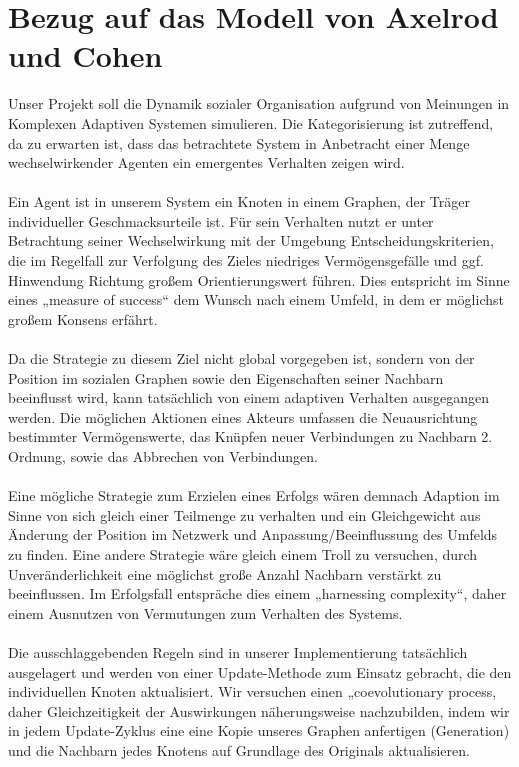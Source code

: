 \documentclass[11pt, a4paper]{scrartcl}
\begin{document}
\section{Bezug auf das Modell von Axelrod und Cohen}


Unser Projekt soll die Dynamik sozialer Organisation aufgrund von Meinungen in Komplexen Adaptiven Systemen simulieren. Die Kategorisierung ist zutreffend, da zu erwarten ist, dass das betrachtete System in Anbetracht einer Menge wechselwirkender Agenten ein emergentes Verhalten zeigen wird. \\
\\
Ein Agent ist in unserem System ein Knoten in einem Graphen, der Träger individueller Geschmacksurteile ist.
Für sein Verhalten nutzt er unter Betrachtung seiner Wechselwirkung mit der Umgebung Entscheidungskriterien, die im Regelfall zur Verfolgung des Zieles niedriges Vermögensgefälle und ggf. Hinwendung Richtung großem Orientierungswert führen. Dies entspricht im Sinne eines „measure of success“ dem Wunsch nach einem Umfeld, in dem er möglichst großem Konsens erfährt.\\
\\
Da die Strategie zu diesem Ziel nicht global vorgegeben ist, sondern von der Position im sozialen Graphen sowie den Eigenschaften seiner Nachbarn beeinflusst wird, kann tatsächlich von einem adaptiven Verhalten ausgegangen werden.
Die möglichen Aktionen eines Akteurs umfassen die Neuausrichtung bestimmter Vermögenswerte, das Knüpfen neuer Verbindungen zu Nachbarn 2. Ordnung, sowie das Abbrechen von Verbindungen.\\
\\
Eine mögliche Strategie zum Erzielen eines Erfolgs wären demnach Adaption im Sinne von sich gleich einer Teilmenge zu verhalten und ein Gleichgewicht aus Änderung der Position im Netzwerk und Anpassung/Beeinflussung des Umfelds zu finden. Eine andere Strategie wäre gleich einem Troll zu versuchen, durch Unveränderlichkeit eine möglichst große Anzahl Nachbarn verstärkt zu beeinflussen.
Im Erfolgsfall entspräche dies einem „harnessing complexity“, daher einem Ausnutzen von Vermutungen zum Verhalten des Systems.\\
\\
Die ausschlaggebenden Regeln sind in unserer Implementierung tatsächlich ausgelagert und werden von einer Update-Methode zum Einsatz gebracht, die den individuellen Knoten aktualisiert.
Wir versuchen einen „coevolutionary process, daher Gleichzeitigkeit der Auswirkungen näherungsweise  nachzubilden, indem wir in jedem Update-Zyklus eine eine Kopie unseres Graphen anfertigen (Generation) und die Nachbarn jedes Knotens auf Grundlage des Originals aktualisieren.\\
\end{document}
